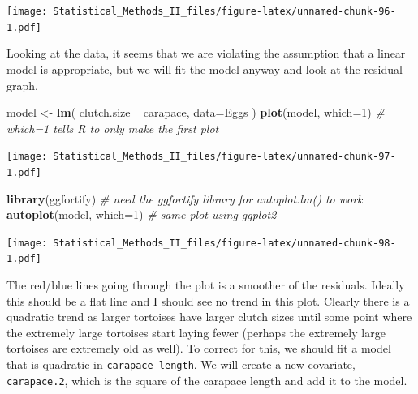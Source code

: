 \documentclass[]{book}
\newenvironment{Shaded}{\begin{snugshade}}{\end{snugshade}}
\newcommand{\KeywordTok}[1]{\textcolor[rgb]{0.13,0.29,0.53}{\textbf{{#1}}}}
\newcommand{\DataTypeTok}[1]{\textcolor[rgb]{0.13,0.29,0.53}{{#1}}}
\newcommand{\DecValTok}[1]{\textcolor[rgb]{0.00,0.00,0.81}{{#1}}}
\newcommand{\StringTok}[1]{\textcolor[rgb]{0.31,0.60,0.02}{{#1}}}
\newcommand{\CommentTok}[1]{\textcolor[rgb]{0.56,0.35,0.01}{\textit{{#1}}}}
\newcommand{\NormalTok}[1]{{#1}}
\theoremstyle{definition}
\theoremstyle{definition}
\theoremstyle{remark}
\begin{document}
\texttt{[image: Statistical\_Methods\_II\_files/figure-latex/unnamed-chunk-96-1.pdf]}

Looking at the data, it seems that we are violating the assumption that
a linear model is appropriate, but we will fit the model anyway and look
at the residual graph.

\begin{Shaded}
\begin{Highlighting}[]
\NormalTok{model <-}\StringTok{ }\KeywordTok{lm}\NormalTok{( clutch.size ~}\StringTok{ }\NormalTok{carapace, }\DataTypeTok{data=}\NormalTok{Eggs )}
\KeywordTok{plot}\NormalTok{(model, }\DataTypeTok{which=}\DecValTok{1}\NormalTok{)      }\CommentTok{# which=1 tells R to only make the first plot}
\end{Highlighting}
\end{Shaded}

\texttt{[image: Statistical\_Methods\_II\_files/figure-latex/unnamed-chunk-97-1.pdf]}

\begin{Shaded}
\begin{Highlighting}[]
\KeywordTok{library}\NormalTok{(ggfortify)        }\CommentTok{# need the ggfortify library for autoplot.lm() to work}
\KeywordTok{autoplot}\NormalTok{(model, }\DataTypeTok{which=}\DecValTok{1}\NormalTok{)  }\CommentTok{# same plot using ggplot2}
\end{Highlighting}
\end{Shaded}

\texttt{[image: Statistical\_Methods\_II\_files/figure-latex/unnamed-chunk-98-1.pdf]}

The red/blue lines going through the plot is a smoother of the
residuals. Ideally this should be a flat line and I should see no trend
in this plot. Clearly there is a quadratic trend as larger tortoises
have larger clutch sizes until some point where the extremely large
tortoises start laying fewer (perhaps the extremely large tortoises are
extremely old as well). To correct for this, we should fit a model that
is quadratic in \texttt{carapace\ length}. We will create a new
covariate, \texttt{carapace.2}, which is the square of the carapace
length and add it to the model.
\end{document}

